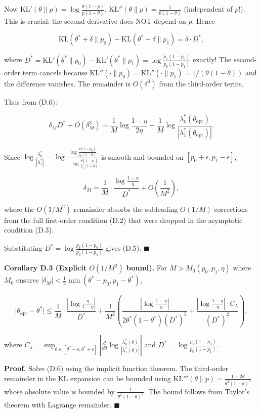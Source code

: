 \documentclass[
  12pt,
]{ctexart}
\begin{document}
Now \(\text{KL}'(\theta\|p) = \log\frac{\theta(1-p)}{p(1-\theta)}\),
\(\text{KL}''(\theta\|p) = \frac{1}{\theta(1-\theta)}\) (independent of
\(p\)!). This is crucial: the second derivative does NOT depend on
\(p\). Hence

\[
\text{KL}(\theta^*+\delta\|p_0) - \text{KL}(\theta^*+\delta\|p_1)
= \delta \cdot D^*,
\]

where
\(D^* = \text{KL}'(\theta^*\|p_0) - \text{KL}'(\theta^*\|p_1) = \log\frac{p_1(1-p_0)}{p_0(1-p_1)}\)
exactly! The second-order term cancels because
\(\text{KL}''(\cdot\|p_0) = \text{KL}''(\cdot\|p_1) = 1/(\theta(1-\theta))\)
and the difference vanishes. The remainder is \(O(\delta^3)\) from the
third-order terms.

Thus from (D.6):

\[
\delta_M D^* + O(\delta_M^3) = \frac{1}{M}\log\frac{1-\eta}{2\eta} + \frac{1}{M}\log\frac{\lambda_0^*(\theta_{\text{opt}})}{|\lambda_1^*(\theta_{\text{opt}})|}.
\]

Since
\(\log\frac{\lambda_0^*}{|\lambda_1^*|} = \log\frac{\log\frac{\theta(1-p_0)}{p_0(1-\theta)}}{-\log\frac{\theta(1-p_1)}{p_1(1-\theta)}}\)
is smooth and bounded on \([p_0+\epsilon, p_1-\epsilon]\),

\[
\delta_M = \frac{1}{M}\cdot\frac{\log\frac{1-\eta}{\eta}}{D^*} + O\!\left(\frac{1}{M^2}\right),
\]

where the \(O(1/M^2)\) remainder absorbs the subleading \(O(1/M)\)
corrections from the full first-order condition (D.2) that were dropped
in the asymptotic condition (D.3).

Substituting \(D^* = \log\frac{p_1(1-p_0)}{p_0(1-p_1)}\) gives (D.5).
\(\blacksquare\)

\textbf{Corollary D.3 (Explicit \(O(1/M^2)\) bound).} For
\(M > M_0(p_0,p_1,\eta)\) where \(M_0\) ensures
\(|\delta_M| < \frac{1}{2}\min(\theta^*-p_0, p_1-\theta^*)\),

\[
\bigl|\theta_{\text{opt}} - \theta^*\bigr|
\leq \frac{1}{M}\cdot\frac{|\log\frac{\eta}{1-\eta}|}{D^*}
+ \frac{1}{M^2}\left(
\frac{|\log\frac{1-\eta}{\eta}|}{2\theta^*(1-\theta^*)(D^*)^3}
+ \frac{|\log\frac{1-\eta}{\eta}|\cdot C_{\lambda}}{(D^*)^2}
\right),
\]

where
\(C_\lambda = \sup_{\theta\in[\theta^*-\epsilon,\theta^*+\epsilon]} \left|\frac{d}{d\theta}\log\frac{\lambda_0^*(\theta)}{|\lambda_1^*(\theta)|}\right|\)
and \(D^* = \log\frac{p_1(1-p_0)}{p_0(1-p_1)}\).

\textbf{Proof.} Solve (D.6) using the implicit function theorem. The
third-order remainder in the KL expansion can be bounded using
\(\text{KL}'''(\theta\|p) = \frac{1-2\theta}{\theta^2(1-\theta)^2}\)
whose absolute value is bounded by \(\frac{1}{\theta^2(1-\theta)^2}\).
The bound follows from Taylor's theorem with Lagrange remainder.
\(\blacksquare\)
\end{document}
